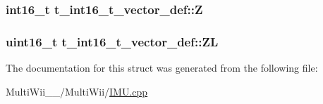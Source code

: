 \hypertarget{structt__int16__t__vector__def_a02931cf5b5f1e894121140a3f8841e3c}{
\subsubsection[{Z}]{\setlength{\rightskip}{0pt plus 5cm}int16\-\_\-t t\-\_\-int16\-\_\-t\-\_\-vector\-\_\-def\-::\-Z}}\label{structt__int16__t__vector__def_a02931cf5b5f1e894121140a3f8841e3c}
\hypertarget{structt__int16__t__vector__def_a5030c7e874783efe3111fba34a4ed9a1}{
\subsubsection[{Z\-L}]{\setlength{\rightskip}{0pt plus 5cm}uint16\-\_\-t t\-\_\-int16\-\_\-t\-\_\-vector\-\_\-def\-::\-Z\-L}}\label{structt__int16__t__vector__def_a5030c7e874783efe3111fba34a4ed9a1}


The documentation for this struct was generated from the following file\-:\begin{DoxyCompactItemize}
\item 
Multi\-Wii\-\_\-\_/\-Multi\-Wii/\hyperlink{IMU_8cpp}{I\-M\-U.\-cpp}\end{DoxyCompactItemize}
